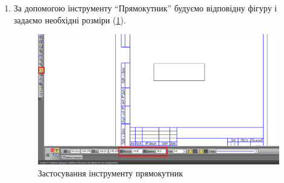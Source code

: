 \begin{enumerate}[leftmargin=*]
\item За допомогою інструменту ``Прямокутник'' будуємо відповідну фігуру і задаємо необхідні розміри (\ref{fig:lab3:rectangle}).
  \begin{figure}[!ht]
    \centering
    \includegraphics[width=0.9\linewidth]{./images/lab3/step1.png}
    \caption{Застосування інструменту прямокутник}
    \label{fig:lab3:rectangle} 
  \end{figure}


\end{enumerate}
